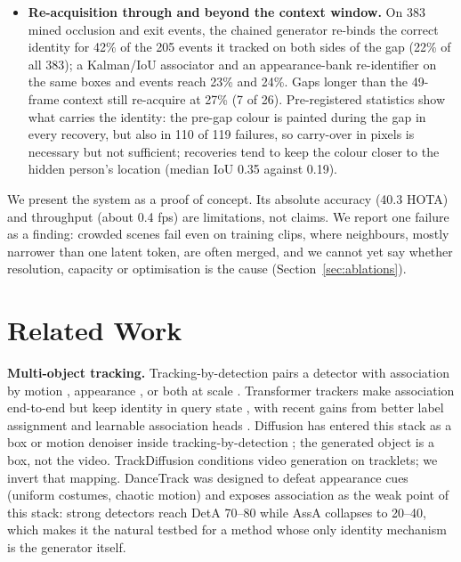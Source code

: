 \documentclass{article} %
\newcommand{\rev}[1]{{\color{blue}#1}}
\begin{document}
\begin{itemize}
\item \textbf{Re-acquisition through and beyond the context window.} On 383 mined
occlusion and exit events, the chained generator re-binds the correct identity for 42\% of
the 205 events it tracked on both sides of the gap (22\% of all 383); a Kalman/IoU
associator and an appearance-bank re-identifier on the same boxes and events reach 23\%
and 24\%. Gaps longer than the 49-frame context still re-acquire at 27\% (7 of 26).
\rev{Pre-registered statistics show what carries the identity: the pre-gap colour is painted
during the gap in every recovery, but also in 110 of 119 failures, so carry-over in pixels
is necessary but not sufficient; recoveries tend to keep the colour closer to the hidden
person's location (median IoU 0.35 against 0.19).}
\end{itemize}

\rev{We present the system as a proof of concept. Its absolute accuracy (40.3 HOTA) and
throughput (about 0.4 fps) are limitations, not claims. We report one failure as a
finding: crowded scenes fail even on training clips, where neighbours, mostly narrower than
one latent token, are often merged, and we cannot yet say whether resolution, capacity or
optimisation is the cause (Section~\ref{sec:ablations}).}

\section{Related Work}

\textbf{Multi-object tracking.} Tracking-by-detection pairs a detector with association by
motion \citep{bewley2016sort}, appearance \citep{wojke2017deepsort}, or both at scale
\citep{zhang2022bytetrack,zhang2021fairmot,zhou2020centertrack}. Transformer trackers make
association end-to-end but keep identity in query state
\citep{zeng2022motr,sun2020transtrack,gao2025motip,segu2025samba,shao2026fdta}\rev{, with
recent gains from better label assignment \citep{yan2025comot,yu2023motrv3} and learnable
association heads \citep{wang2025lamotr}}. Diffusion
has entered this stack as a box or motion denoiser inside tracking-by-detection
\citep{luo2024diffusiontrack,lv2024diffmot}; the generated object is a box, not the video.
TrackDiffusion \citep{li2025trackdiffusion} conditions video generation on tracklets; we
invert that mapping. DanceTrack \citep{sun2022dancetrack} was designed to defeat appearance
cues (uniform costumes, chaotic motion) and exposes association as the weak point of this
stack: strong detectors reach DetA 70--80 while AssA collapses to 20--40, which makes it
the natural testbed for a method whose only identity mechanism is the generator itself.
\end{document}
